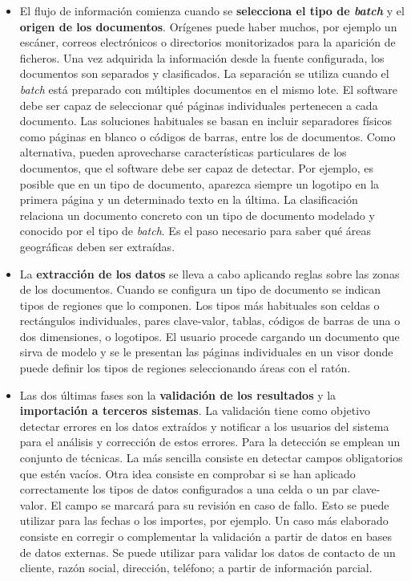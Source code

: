 \begin{itemize}
    \item El flujo de información comienza cuando se \textbf{selecciona el tipo de \emph{batch}} y el \textbf{origen de los documentos}. Orígenes puede haber muchos, por ejemplo un escáner, correos electrónicos o directorios monitorizados para la aparición de ficheros. Una vez adquirida la información desde la fuente configurada, los documentos son separados y clasificados. La separación se utiliza cuando el \emph{batch} está preparado con múltiples documentos en el mismo lote. El software debe ser capaz de seleccionar qué páginas individuales pertenecen a cada documento. Las soluciones habituales se basan en incluir separadores físicos como páginas en blanco o códigos de barras, entre los de documentos. Como alternativa, pueden aprovecharse características particulares de los documentos, que el software debe ser capaz de detectar. Por ejemplo, es posible que en un tipo de documento, aparezca siempre un logotipo en la primera página y un determinado texto en la última. La clasificación relaciona un documento concreto con un tipo de documento modelado y conocido por el tipo de \emph{batch}. Es el paso necesario para saber qué áreas geográficas deben ser extraídas.
    
    \item La \textbf{extracción de los datos} se lleva a cabo aplicando reglas sobre las zonas de los documentos. Cuando se configura un tipo de documento se indican tipos de regiones que lo componen. Los tipos más habituales son celdas o rectángulos individuales, pares clave-valor, tablas, códigos de barras de una o dos dimensiones, o logotipos. El usuario procede cargando un documento que sirva de modelo y se le presentan las páginas individuales en un visor donde puede definir los tipos de regiones seleccionando áreas con el ratón.
    
    \item Las dos últimas fases son la \textbf{validación de los resultados} y la \textbf{importación a terceros sistemas}. La validación tiene como objetivo detectar errores en los datos extraídos y notificar a los usuarios del sistema para el análisis y corrección de estos errores. Para la detección se emplean un conjunto de técnicas. La más sencilla consiste en detectar campos obligatorios que estén vacíos. Otra idea consiste en comprobar si se han aplicado correctamente los tipos de datos configurados a una celda o un par clave-valor. El campo se marcará para su revisión en caso de fallo. Esto se puede utilizar para las fechas o los importes, por ejemplo. Un caso más elaborado consiste en corregir o complementar la validación a partir de datos en bases de datos externas. Se puede utilizar para validar los datos de contacto de un cliente, razón social, dirección, teléfono; a partir de información parcial.
    

\end{itemize}
